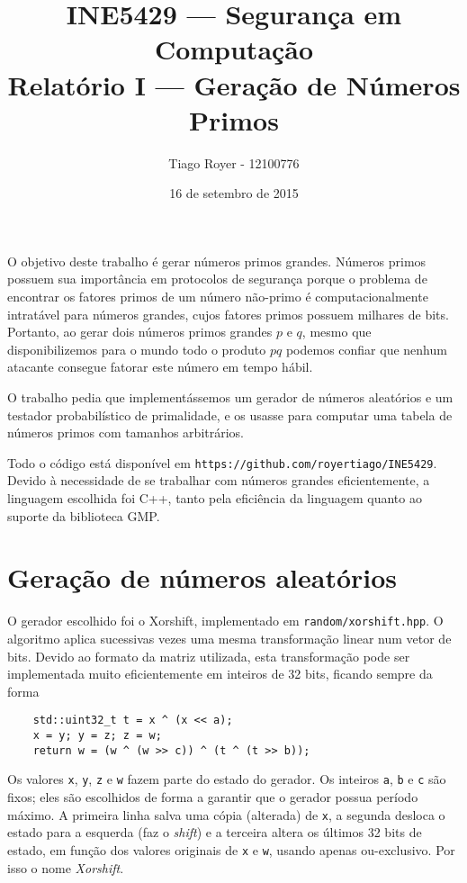 \documentclass{article}
\title{
    INE5429 --- Segurança em Computação \\
    Relatório I --- Geração de Números Primos
}
\author{
    Tiago Royer - 12100776
}
\date{16 de setembro de 2015}
\begin{document}
\maketitle

O objetivo deste trabalho é gerar números primos grandes.
Números primos possuem sua importância em protocolos de segurança
porque o problema de encontrar os fatores primos de um número não-primo
é computacionalmente intratável para números grandes,
cujos fatores primos possuem milhares de bits.
Portanto, ao gerar dois números primos grandes $p$ e $q$,
mesmo que disponibilizemos para o mundo todo o produto $pq$
podemos confiar que nenhum atacante consegue fatorar este número em tempo hábil.

O trabalho pedia que implementássemos um gerador de números aleatórios
e um testador probabilístico de primalidade,
e os usasse para computar uma tabela de números primos com tamanhos arbitrários.

Todo o código está disponível em \verb"https://github.com/royertiago/INE5429".
Devido à necessidade de se trabalhar com números grandes eficientemente,
a linguagem escolhida foi C++,
tanto pela eficiência da linguagem quanto ao suporte da biblioteca GMP.

\section{Geração de números aleatórios}

O gerador escolhido foi o Xorshift,
implementado em \verb"random/xorshift.hpp".
O algoritmo aplica sucessivas vezes uma mesma transformação linear
num vetor de bits.
Devido ao formato da matriz utilizada,
esta transformação pode ser implementada muito eficientemente em inteiros de 32 bits,
ficando sempre da forma
\begin{verbatim}
    std::uint32_t t = x ^ (x << a);
    x = y; y = z; z = w;
    return w = (w ^ (w >> c)) ^ (t ^ (t >> b));
\end{verbatim}
Os valores \verb"x", \verb"y", \verb"z" e \verb"w" fazem parte do estado do gerador.
Os inteiros \verb"a", \verb"b" e \verb"c" são fixos;
eles são escolhidos de forma a garantir que o gerador possua período máximo.
A primeira linha salva uma cópia (alterada) de \verb"x",
a segunda desloca o estado para a esquerda (faz o \emph{shift})
e a terceira altera os últimos 32 bits de estado,
em função dos valores originais de \verb"x" e \verb"w",
usando apenas ou-exclusivo.
Por isso o nome \emph{Xorshift}.
\end{document}
